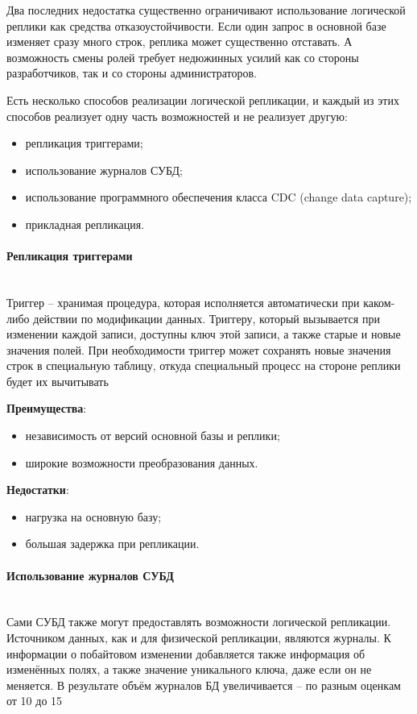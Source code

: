 Два последних недостатка существенно ограничивают использование логической реплики как средства отказоустойчивости. Если
один запрос в основной базе изменяет сразу много строк, реплика может существенно отставать. А возможность смены ролей
требует недюжинных усилий как со стороны разработчиков, так и со стороны администраторов.

Есть несколько способов реализации логической репликации, и каждый из этих способов реализует одну часть возможностей и
не реализует другую:
\begin{itemize}
    \item репликация триггерами;
    \item использование журналов СУБД;
    \item использование программного обеспечения класса CDC (change data capture);
    \item прикладная репликация.
\end{itemize}

\paragraph{Репликация триггерами} ~\\
Триггер – хранимая процедура, которая исполняется автоматически при каком-либо действии по модификации данных. Триггеру,
который вызывается при изменении каждой записи, доступны ключ этой записи, а также старые и новые значения полей. При
необходимости триггер может сохранять новые значения строк в специальную таблицу, откуда специальный процесс на стороне
реплики будет их вычитывать

\textbf{Преимущества}:
\begin{itemize}
    \item независимость от версий основной базы и реплики;
    \item широкие возможности преобразования данных.
\end{itemize}

\textbf{Недостатки}:
\begin{itemize}
    \item нагрузка на основную базу;
    \item большая задержка при репликации.
\end{itemize}

\paragraph{Использование журналов СУБД} ~\\
Сами СУБД также могут предоставлять возможности логической репликации. Источником данных, как и для физической
репликации, являются журналы. К информации о побайтовом изменении добавляется также информация об изменённых полях, а
также значение уникального ключа, даже если он не меняется. В результате объём журналов БД увеличивается – по разным
оценкам от 10 до 15%

